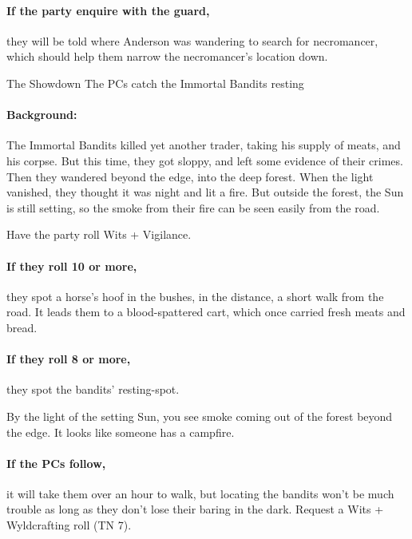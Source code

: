 \begin{multicols}{2}
\paragraph{If the party enquire with the \gls{guard},}
they will be told where Anderson was wandering to search for \gls{necromancer}, which should help them narrow the necromancer's location down.

{The Showdown}%
{The PCs catch the Immortal Bandits resting}%

\paragraph{Background:}
The Immortal Bandits killed yet another trader, taking his supply of meats, and his corpse.
But this time, they got sloppy, and left some evidence of their crimes.
Then they wandered beyond the \gls{edge}, into the deep forest.
When the light vanished, they thought it was night and lit a fire.
But outside the forest, the Sun is still setting, so the smoke from their fire can be seen easily from the road.

Have the party roll Wits + Vigilance.

\paragraph{If they roll 10 or more,}
they spot a horse's hoof in the bushes, in the distance, a short walk from the road.
It leads them to a blood-spattered cart, which once carried fresh meats and bread.

\paragraph{If they roll 8 or more,}
they spot the bandits' resting-spot.

\begin{boxtext}
  By the light of the setting Sun, you see smoke coming out of the forest beyond the \gls{edge}.
  It looks like someone has a campfire.
\end{boxtext}

\paragraph{If the PCs follow,}
it will take them over an hour to walk, but locating the bandits won't be much trouble as long as they don't lose their baring in the dark.
Request a Wits + Wyldcrafting roll (TN 7).


\end{multicols}
